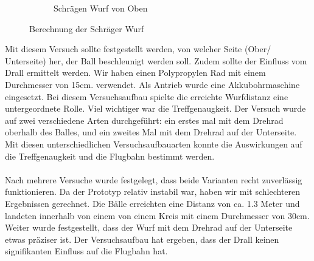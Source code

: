 \begin{figure}[h!]
\begin{subfigure}{.4\textwidth}
		\caption{Schrägen Wurf von Oben}
		\label{fig:Drehrad}
	\end{subfigure}
	\caption{Berechnung der Schräger Wurf}
	\label{Drehrad Versuch}
\end{figure}
Mit diesem Versuch sollte festgestellt werden, von welcher Seite (Ober/ Unterseite) her, der Ball beschleunigt werden soll. Zudem sollte der Einfluss vom Drall ermittelt werden. Wir haben einen Polypropylen Rad mit einem Durchmesser von 15cm. verwendet. Als Antrieb wurde eine Akkubohrmaschine eingesetzt. Bei diesem Versuchsaufbau spielte die erreichte Wurfdistanz eine untergeordnete Rolle. Viel wichtiger war die Treffgenaugkeit.  
Der Versuch wurde auf zwei verschiedene Arten durchgeführt: ein erstes mal mit dem Drehrad oberhalb des Balles, und ein zweites Mal mit dem Drehrad auf der Unterseite. Mit diesen unterschiedlichen Versuchsaufbauarten konnte die Auswirkungen auf die Treffgenaugkeit und die Flugbahn bestimmt werden.\\ \\
Nach mehrere Versuche wurde festgelegt, dass beide Varianten recht zuverlässig funktionieren. Da der Prototyp relativ instabil war, haben wir mit schlechteren Ergebnissen gerechnet. Die Bälle erreichten eine Distanz von ca. 1.3 Meter und landeten innerhalb von einem von einem Kreis mit einem Durchmesser von 30cm. 
\\Weiter wurde festgestellt, dass der Wurf mit dem Drehrad auf der Unterseite etwas präziser ist. Der Versuchsaufbau hat ergeben, dass der Drall keinen signifikanten Einfluss auf die Flugbahn hat.\\

